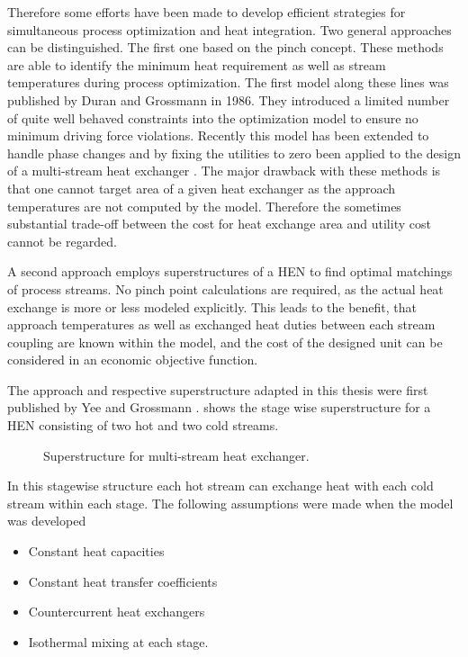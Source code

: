     Therefore some efforts have been made to develop efficient strategies for simultaneous process optimization
    and heat integration. Two general approaches can be distinguished. The first one based on the pinch concept.
     These methods are able to identify the minimum heat requirement
    as well as stream temperatures during process optimization. The first model along these lines was published
    by Duran and Grossmann \cite{Duran.1986} in 1986. They introduced a limited number of quite well behaved
    constraints into the optimization model to ensure no minimum driving force violations. Recently
    this model has been extended to handle phase changes and by fixing the utilities to zero been applied
    to the design of a multi-stream heat exchanger \cite{Kamath.2012}. The major drawback with these methods
    is that one cannot target area of a given heat exchanger as the approach temperatures are not computed
    by the model. Therefore the sometimes substantial trade-off between the cost for heat exchange area
    and utility cost cannot be regarded.

    A second approach employs superstructures of a HEN to find optimal matchings of process streams. No pinch
    point calculations are required, as the actual heat exchange is more or less modeled explicitly. This
    leads to the benefit, that approach temperatures as well as exchanged heat duties between each stream coupling
    are known within the model, and the cost of the designed unit can be considered in an economic objective
    function.

    The approach and respective superstructure adapted in this thesis were first published by Yee and Grossmann
    \cite{Yee.1990}.  shows the stage wise superstructure for a HEN consisting of two hot
    and two cold streams.

    \begin{figure}
        
        \caption{Superstructure for multi-stream heat exchanger. \cite{Yee.1990}}
        \label{fig:HX_super}
    \end{figure}

    In this stagewise structure each hot stream can exchange heat with each cold stream within each stage.
    The following assumptions were made when the model was developed
    \begin{itemize}
        \item Constant heat capacities
        \item Constant heat transfer coefficients
        \item Countercurrent heat exchangers
        \item Isothermal mixing at each stage.
    \end{itemize}

